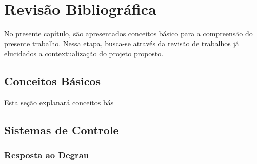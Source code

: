 \chapter{Revisão Bibliográfica}

No presente capítulo, são apresentados conceitos básico para a compreensão do presente trabalho. Nessa etapa, busca-se através da revisão de trabalhos já elucidados a contextualização do projeto proposto.

\section{Conceitos Básicos}


Esta seção explanará conceitos bás

\section{Sistemas de Controle}


\subsection{Resposta ao Degrau}

